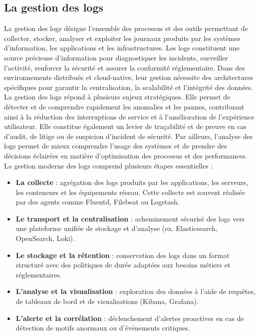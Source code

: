 \subsection{La gestion des logs}

La gestion des logs désigne l’ensemble des processus et des outils permettant de collecter, stocker, analyser et exploiter les journaux produits par les systèmes d’information, les applications et les infrastructures. Les logs constituent une source précieuse d’information pour diagnostiquer les incidents, surveiller l’activité, renforcer la sécurité et assurer la conformité réglementaire. Dans des environnements distribués et cloud-native, leur gestion nécessite des architectures spécifiques pour garantir la centralisation, la scalabilité et l’intégrité des données.
La gestion des logs répond à plusieurs enjeux stratégiques. Elle permet de détecter et de comprendre rapidement les anomalies et les pannes, contribuant ainsi à la réduction des interruptions de service et à l’amélioration de l’expérience utilisateur. Elle constitue également un levier de traçabilité et de preuve en cas d’audit, de litige ou de suspicion d’incident de sécurité. Par ailleurs, l’analyse des logs permet de mieux comprendre l’usage des systèmes et de prendre des décisions éclairées en matière d’optimisation des processus et des performances.
La gestion moderne des logs comprend plusieurs étapes essentielles :
\begin{itemize}
	\item \textbf{La collecte}  : agrégation des logs produits par les applications, les serveurs, les conteneurs et les équipements réseau. Cette collecte est souvent réalisée par des agents comme Fluentd, Filebeat ou Logstash.
	\item \textbf{Le transport et la centralisation}  : acheminement sécurisé des logs vers une plateforme unifiée de stockage et d’analyse (ex. Elasticsearch, OpenSearch, Loki).
	\item \textbf{Le stockage et la rétention}  : conservation des logs dans un format structuré avec des politiques de durée adaptées aux besoins métiers et réglementaires.
	\item \textbf{L’analyse et la visualisation}  : exploration des données à l’aide de requêtes, de tableaux de bord et de visualisations (Kibana, Grafana).
	\item \textbf{L’alerte et la corrélation}  : déclenchement d’alertes proactives en cas de détection de motifs anormaux ou d’événements critiques.
\end{itemize}

